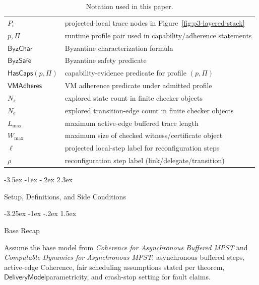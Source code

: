 \documentclass[a4paper,10pt,twocolumn,english]{article}
\makeatletter
\renewcommand{\section}{\@startsection{section}{1}{\z@}%
  {-3.5ex \@plus -1ex \@minus -.2ex}%
  {2.3ex}%
  {\raggedright\normalfont\large\bfseries}}
\renewcommand{\subsection}{\@startsection{subsection}{2}{\z@}%
  {-3.25ex \@plus -1ex \@minus -.2ex}%
  {1.5ex}%
  {\raggedright\normalfont\normalsize\bfseries}}
\numberwithin{equation}{section}
\theoremstyle{paperdef}
\theoremstyle{paperplain}
\theoremstyle{paperdef}
\theoremstyle{paperremark}
\theoremstyle{paperdef}
\newcommand{\DeliveryModel}{\ensuremath{\mathsf{DeliveryModel}}}
\newcommand{\ByzSafe}{\ensuremath{\mathsf{ByzSafe}}}
\newcommand{\ByzChar}{\ensuremath{\mathsf{ByzChar}}}
\newcommand{\VMAdheres}{\ensuremath{\mathsf{VMAdheres}}}
\makeatother
\begin{document}
\begin{table}[H]
\begin{tabularx}{\columnwidth}{@{}L{0.34\columnwidth}L{0.61\columnwidth}@{}}
		$P_i$                        & projected-local trace nodes in Figure~\ref{fig:p3-layered-stack} \\
		$p,\Pi$                      & runtime profile pair used in capability/adherence statements     \\
		\ByzChar                     & Byzantine characterization formula                               \\
		\ByzSafe                     & Byzantine safety predicate                                       \\
		$\mathsf{HasCaps}(p,\Pi)$    & capability-evidence predicate for profile $(p,\Pi)$              \\
		\VMAdheres                   & VM adherence predicate under admitted profile                    \\
		$N_s$                        & explored state count in finite checker objects                   \\
		$N_e$                        & explored transition-edge count in finite checker objects         \\
		$L_{\max}$                   & maximum active-edge buffered trace length                        \\
		$W_{\max}$                   & maximum size of checked witness/certificate object               \\
		$\ell$                       & projected local-step label for reconfiguration steps             \\
		$\rho$                       & reconfiguration step label (link/delegate/transition)            \\
		\bottomrule
	\end{tabularx}
	\caption{Notation used in this paper.}
	\label{tab:p3-notation}
\end{table}

\section{Setup, Definitions, and Side Conditions}
\label{sec:setup}

\subsection{Base Recap}

Assume the base model from \emph{Coherence for Asynchronous Buffered MPST} and \emph{Computable Dynamics for Asynchronous MPST}: asynchronous buffered steps, active-edge Coherence, fair scheduling assumptions stated per theorem, \DeliveryModel parametricity, and crash-stop setting for fault claims.
\end{document}
